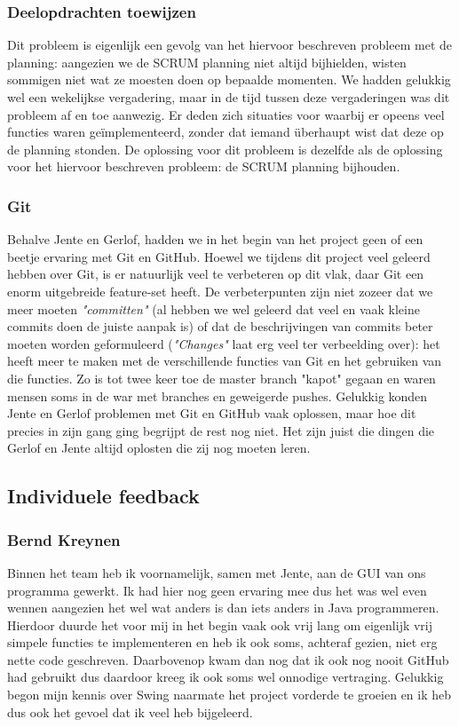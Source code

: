 \documentclass[a4paper,11pt]{article}
\begin{document}
\subsubsection{Deelopdrachten toewijzen}
Dit probleem is eigenlijk een gevolg van het hiervoor beschreven probleem met de planning: aangezien we de SCRUM planning niet altijd bijhielden, wisten sommigen niet wat ze moesten doen op bepaalde momenten. We hadden gelukkig wel een wekelijkse vergadering, maar in de tijd tussen deze vergaderingen was dit probleem af en toe aanwezig. Er deden zich situaties voor waarbij er opeens veel functies waren ge\"{i}mplementeerd, zonder dat iemand überhaupt wist dat deze op de planning stonden. De oplossing voor dit probleem is dezelfde als de oplossing voor het hiervoor beschreven probleem: de SCRUM planning bijhouden.

\subsubsection{Git}
Behalve Jente en Gerlof, hadden we in het begin van het project geen of een beetje ervaring met Git en GitHub. Hoewel we tijdens dit project veel geleerd hebben over Git, is er natuurlijk veel te verbeteren op dit vlak, daar Git een enorm uitgebreide feature-set heeft. De verbeterpunten zijn niet zozeer dat we meer moeten \textit{"committen"} (al hebben we wel geleerd dat veel en vaak kleine commits doen de juiste aanpak is) of dat de beschrijvingen van commits beter moeten worden geformuleerd (\textit{"Changes"} laat erg veel ter verbeelding over): het heeft meer te maken met de verschillende functies van Git en het gebruiken van die functies. Zo is tot twee keer toe de master branch "kapot" gegaan en waren mensen soms in de war met branches en geweigerde pushes. Gelukkig konden Jente en Gerlof problemen met Git en GitHub vaak oplossen, maar hoe dit precies in zijn gang ging begrijpt de rest nog niet. Het zijn juist die dingen die Gerlof en Jente altijd oplosten die zij nog moeten leren.

\subsection{Individuele feedback}
\subsubsection{Bernd Kreynen}
Binnen het team heb ik voornamelijk, samen met Jente, aan de GUI van ons programma gewerkt. Ik had hier nog geen ervaring mee dus het was wel even wennen aangezien het wel wat anders is dan iets anders in Java programmeren. Hierdoor duurde het voor mij in het begin vaak ook vrij lang om eigenlijk vrij simpele functies te implementeren en heb ik ook soms, achteraf gezien, niet erg nette code geschreven. Daarbovenop kwam dan nog dat ik ook nog nooit GitHub had gebruikt dus daardoor kreeg ik ook soms wel onnodige vertraging. Gelukkig begon mijn kennis over Swing naarmate het project vorderde te groeien en ik heb dus ook het gevoel dat ik veel heb bijgeleerd.\\
\end{document}

